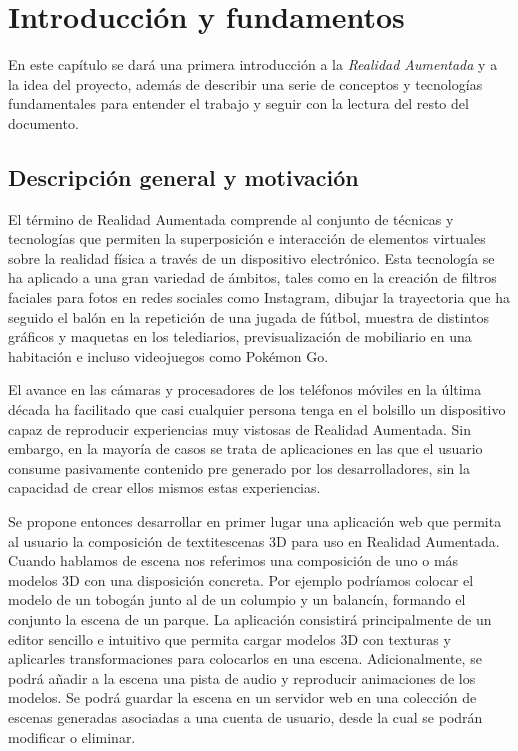 \chapter{Introducción y fundamentos}


En este capítulo se dará una primera introducción a la \textit{Realidad Aumentada} y a la idea del proyecto, además de describir una serie de conceptos y tecnologías fundamentales para entender el trabajo y seguir con la lectura del resto del documento.


\section{Descripción general y motivación}

El término de Realidad Aumentada comprende al conjunto de técnicas y tecnologías que permiten la superposición e interacción de elementos virtuales sobre la realidad física a través de un dispositivo electrónico. Esta tecnología se ha aplicado a una gran variedad de ámbitos, tales como en la creación de filtros faciales para fotos en redes sociales como Instagram, dibujar la trayectoria que ha seguido el balón en la repetición de una jugada de fútbol, muestra de distintos gráficos y maquetas en los telediarios, previsualización de mobiliario en una habitación e incluso videojuegos como Pokémon Go.

El avance en las cámaras y procesadores de los teléfonos móviles en la última década ha facilitado que casi cualquier persona tenga en el bolsillo un dispositivo capaz de reproducir experiencias muy vistosas de Realidad Aumentada. Sin embargo, en la mayoría de casos se trata de aplicaciones en las que el usuario consume pasivamente contenido pre generado por los desarrolladores, sin la capacidad de crear ellos mismos estas experiencias.

Se propone entonces desarrollar en primer lugar una aplicación web que permita al usuario la composición de textit{escenas 3D} para uso en Realidad Aumentada. Cuando hablamos de escena nos referimos una composición de uno o más modelos 3D con una disposición concreta. Por ejemplo podríamos colocar el modelo de un tobogán junto al de un columpio y un balancín, formando el conjunto la escena de un parque. La aplicación consistirá principalmente de un editor sencillo e intuitivo que permita cargar modelos 3D con texturas y aplicarles transformaciones para colocarlos en una escena. Adicionalmente, se podrá añadir a la escena una pista de audio y reproducir animaciones de los modelos. Se podrá guardar la escena en un servidor web en una colección de escenas generadas asociadas a una cuenta de usuario, desde la cual se podrán modificar o eliminar.


